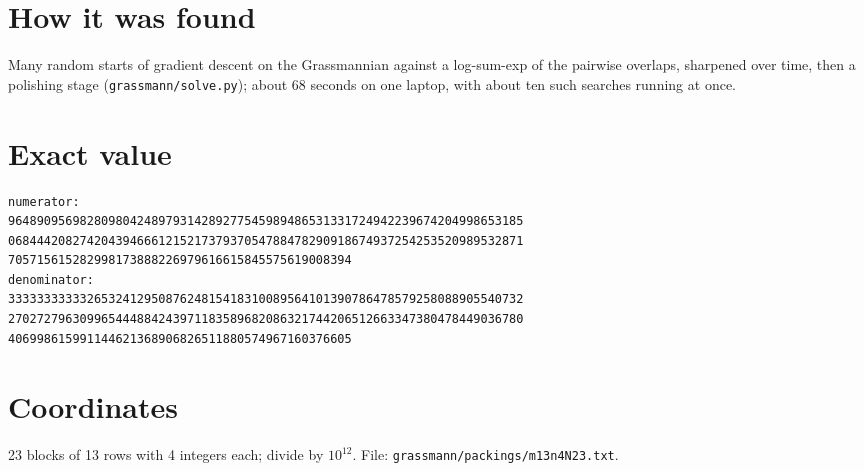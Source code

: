 \documentclass[11pt,a4paper]{article}
\begin{document}
\section{How it was found}
Many random starts of gradient descent on the Grassmannian against a log-sum-exp of the pairwise overlaps, sharpened over time, then a polishing stage (\texttt{grassmann/solve.py}); about 68 seconds on one laptop, with about ten such searches running at once.


\appendix
\section{Exact value}
{\small
\begin{verbatim}
numerator:
964890956982809804248979314289277545989486531331724942239674204998653185
068444208274204394666121521737937054788478290918674937254253520989532871
705715615282998173888226979616615845575619008394
denominator:
333333333332653241295087624815418310089564101390786478579258088905540732
270272796309965444884243971183589682086321744206512663347380478449036780
406998615991144621368906826511880574967160376605
\end{verbatim}}

\section{Coordinates}
23 blocks of 13 rows with 4 integers each; divide by $10^{12}$. File: \texttt{grassmann/packings/m13n4N23.txt}.
{\tiny
\begin{multicols}{3}
\end{multicols}}
\end{document}
